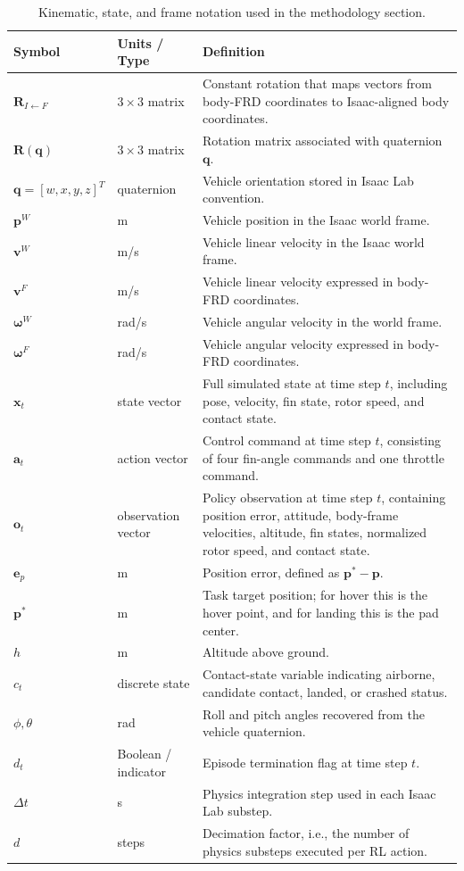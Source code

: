 \documentclass[10pt,twocolumn]{article}
\begin{document}
\begin{table}[!t]
\centering
\caption{Kinematic, state, and frame notation used in the methodology section.}
\label{tab:notation_kinematics}
\scriptsize
\renewcommand{\arraystretch}{0.97}
\begin{tabularx}{\textwidth}{@{}p{1.25in}p{1.50in}X@{}}
\toprule
Symbol & Units / Type & Definition \\
\midrule
$\mathbf{R}_{I\leftarrow F}$ & $3\times 3$ matrix & Constant rotation that maps vectors from body-FRD coordinates to Isaac-aligned body coordinates. \\
$\mathbf{R}(\mathbf{q})$ & $3\times 3$ matrix & Rotation matrix associated with quaternion $\mathbf{q}$. \\
$\mathbf{q}=[w,x,y,z]^T$ & quaternion & Vehicle orientation stored in Isaac Lab convention. \\
$\mathbf{p}^{W}$ & m & Vehicle position in the Isaac world frame. \\
$\mathbf{v}^{W}$ & m/s & Vehicle linear velocity in the Isaac world frame. \\
$\mathbf{v}^{F}$ & m/s & Vehicle linear velocity expressed in body-FRD coordinates. \\
$\boldsymbol{\omega}^{W}$ & rad/s & Vehicle angular velocity in the world frame. \\
$\boldsymbol{\omega}^{F}$ & rad/s & Vehicle angular velocity expressed in body-FRD coordinates. \\
$\mathbf{x}_{t}$ & state vector & Full simulated state at time step $t$, including pose, velocity, fin state, rotor speed, and contact state. \\
$\mathbf{a}_{t}$ & action vector & Control command at time step $t$, consisting of four fin-angle commands and one throttle command. \\
$\mathbf{o}_{t}$ & observation vector & Policy observation at time step $t$, containing position error, attitude, body-frame velocities, altitude, fin states, normalized rotor speed, and contact state. \\
$\mathbf{e}_{p}$ & m & Position error, defined as $\mathbf{p}^{*}-\mathbf{p}$. \\
$\mathbf{p}^{*}$ & m & Task target position; for hover this is the hover point, and for landing this is the pad center. \\
$h$ & m & Altitude above ground. \\
$c_t$ & discrete state & Contact-state variable indicating airborne, candidate contact, landed, or crashed status. \\
$\phi,\theta$ & rad & Roll and pitch angles recovered from the vehicle quaternion. \\
$d_t$ & Boolean / indicator & Episode termination flag at time step $t$. \\
$\Delta t$ & s & Physics integration step used in each Isaac Lab substep. \\
$d$ & steps & Decimation factor, i.e., the number of physics substeps executed per RL action. \\
\bottomrule
\end{tabularx}
\end{table}
\end{document}
